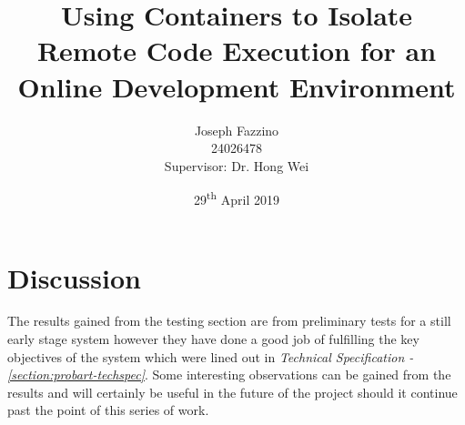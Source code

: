 \documentclass[12pt, a4paper]{extreport}
\title{Using Containers to Isolate Remote Code Execution for an Online Development Environment}
\author{
    Joseph Fazzino\\
    24026478\\
    [4cm]{Supervisor: Dr. Hong Wei}
}
\date{29\textsuperscript{th} April 2019}
\begin{document}
\maketitle
\setcounter{tocdepth}{1}
\tableofcontents
\pagebreak



\pagebreak



\pagebreak

















\chapter{Discussion}


The results gained from the testing section are from preliminary tests for a still early stage system however they have done a good job of fulfilling the key objectives of the system which were lined out in \textit{Technical Specification - \ref{section:probart-techspec}}. Some interesting observations can be gained from the results and will certainly be useful in the future of the project should it continue past the point of this series of work. 
\end{document}
